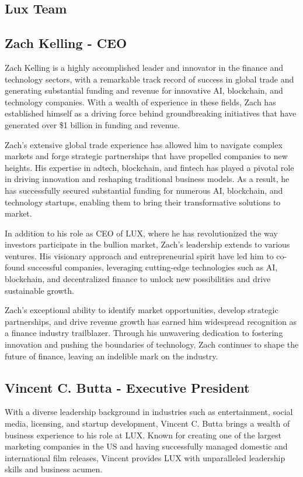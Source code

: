 \documentclass[11pt]{article}
\begin{document}
\subsection{Lux Team}

\subsection{Zach Kelling - CEO}

Zach Kelling is a highly accomplished leader and innovator in the finance and technology sectors, with a remarkable track record of success in global trade and generating substantial funding and revenue for innovative AI, blockchain, and technology companies. With a wealth of experience in these fields, Zach has established himself as a driving force behind groundbreaking initiatives that have generated over \$1 billion in funding and revenue.


Zach's extensive global trade experience has allowed him to navigate complex markets and forge strategic partnerships that have propelled companies to new heights. His expertise in adtech, blockchain, and fintech has played a pivotal role in driving innovation and reshaping traditional business models. As a result, he has successfully secured substantial funding for numerous AI, blockchain, and technology startups, enabling them to bring their transformative solutions to market.


In addition to his role as CEO of LUX, where he has revolutionized the way investors participate in the bullion market, Zach's leadership extends to various ventures. His visionary approach and entrepreneurial spirit have led him to co-found successful companies, leveraging cutting-edge technologies such as AI, blockchain, and decentralized finance to unlock new possibilities and drive sustainable growth.


Zach's exceptional ability to identify market opportunities, develop strategic partnerships, and drive revenue growth has earned him widespread recognition as a finance industry trailblazer. Through his unwavering dedication to fostering innovation and pushing the boundaries of technology, Zach continues to shape the future of finance, leaving an indelible mark on the industry.


\subsection{Vincent C. Butta - Executive President}

With a diverse leadership background in industries such as entertainment, social media, licensing, and startup development, Vincent C. Butta brings a wealth of business experience to his role at LUX. Known for creating one of the largest marketing companies in the US and having successfully managed domestic and international film releases, Vincent provides LUX with unparalleled leadership skills and business acumen.
\end{document}
